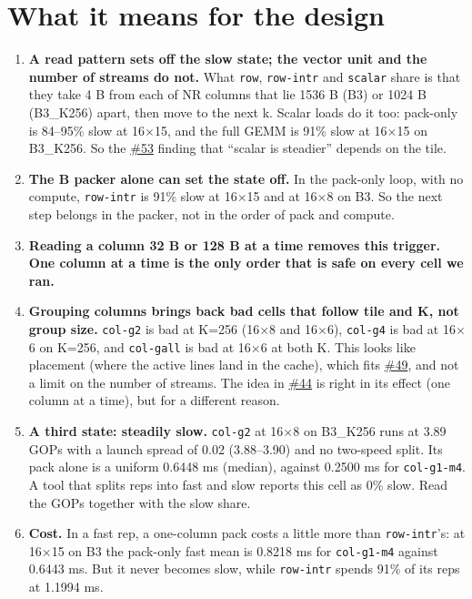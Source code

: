 \documentclass[10pt,a4paper]{article}
\newcommand{\iss}[1]{\href{https://github.com/JieGH/RVV_code_gen_via_MLIR_xDSL/issues/#1}{\##1}}
\newcommand{\key}[1]{\textbf{\textcolor{blue!55!black}{#1}}}  %
\begin{document}
\section{What it means for the design}
\label{sec:insight}
\begin{enumerate}
  \item \textbf{A read pattern sets off the slow state; the vector unit and the number of streams do not.} What \texttt{row},
  \texttt{row-intr} and \texttt{scalar} share is that they take 4 B from each of NR columns that lie 1536 B (B3) or 1024 B (B3\_K256) apart, then move to the next k.
  Scalar loads do it too: pack-only is 84--95\% slow at 16$\times$15, and the full GEMM is 91\% slow at 16$\times$15 on B3\_K256. So the
  \iss{53} finding that ``scalar is steadier'' depends on the tile.
  \item \textbf{The B packer alone can set the state off.} In the pack-only loop, with no compute, \texttt{row-intr} is 91\% slow at
  16$\times$15 and at 16$\times$8 on B3. So the next step belongs in the packer, not in the order of pack and compute.
  \item \textbf{Reading a column 32 B or 128 B at a time removes this trigger.} \key{One column at a time is the only order that is safe on
  every cell we ran.}
  \item \textbf{Grouping columns brings back bad cells that follow tile and K, not group size.} \texttt{col-g2} is bad at K=256
  (16$\times$8 and 16$\times$6), \texttt{col-g4} is bad at 16$\times$6 on K=256, and \texttt{col-gall} is bad at 16$\times$6 at both K.
  This looks like placement (where the active lines land in the cache), which fits \iss{49}, and not a limit on the number of streams.
  The idea in \iss{44} is right in its effect (one column at a time), but for a different reason.
  \item \textbf{A third state: steadily slow.} \texttt{col-g2} at 16$\times$8 on B3\_K256 runs at 3.89 GOPs with a launch spread of 0.02
  (3.88--3.90) and no two-speed split. Its pack alone is a uniform 0.6448 ms (median), against 0.2500 ms for \texttt{col-g1-m4}.
  A tool that splits reps into fast and slow reports this cell as 0\% slow. Read the GOPs together with the slow share.
  \item \textbf{Cost.} In a fast rep, a one-column pack costs a little more than \texttt{row-intr}'s: at 16$\times$15 on B3 the pack-only
  fast mean is 0.8218 ms for \texttt{col-g1-m4} against 0.6443 ms. But it never becomes slow, while \texttt{row-intr} spends 91\% of its
  reps at 1.1994 ms.

\end{enumerate}
\end{document}

